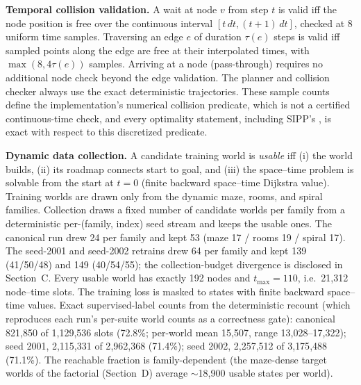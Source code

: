 \documentclass[letterpaper]{article} %
\begin{document}
\begin{table}[t]
\label{tab:archspec}
\end{table}

\textbf{Temporal collision validation.} A wait at node $v$ from step $t$ is valid iff the node position is free over the continuous interval $[t\,dt, (t{+}1)\,dt]$, checked at 8 uniform time samples. Traversing an edge $e$ of duration $\tau(e)$ steps is valid iff sampled points along the edge are free at their interpolated times, with $\max(8, 4\tau(e))$ samples. Arriving at a node (pass-through) requires no additional node check beyond the edge validation. The planner and collision checker always use the exact deterministic trajectories. These sample counts define the implementation's numerical collision predicate, which is not a certified continuous-time check, and every optimality statement, including SIPP's \citep{phillips2011sipp}, is exact with respect to this discretized predicate.

\textbf{Dynamic data collection.} A candidate training world is \emph{usable} iff (i) the world builds, (ii) its roadmap connects start to goal, and (iii) the space--time problem is solvable from the start at $t{=}0$ (finite backward space--time Dijkstra value). Training worlds are drawn only from the dynamic maze, rooms, and spiral families. Collection draws a fixed number of candidate worlds per family from a deterministic per-(family, index) seed stream and keeps the usable ones. The canonical run drew 24 per family and kept 53 (maze 17 / rooms 19 / spiral 17). The seed-2001 and seed-2002 retrains drew 64 per family and kept 139 (41/50/48) and 149 (40/54/55); the collection-budget divergence is disclosed in Section~C. Every usable world has exactly 192 nodes and $t_{\max}{=}110$, i.e.\ 21{,}312 node--time slots. The training loss is masked to states with finite backward space--time values. Exact supervised-label counts from the deterministic recount (which reproduces each run's per-suite world counts as a correctness gate): canonical 821{,}850 of 1{,}129{,}536 slots (72.8\%; per-world mean 15{,}507, range 13{,}028--17{,}322); seed 2001, 2{,}115{,}331 of 2{,}962{,}368 (71.4\%); seed 2002, 2{,}257{,}512 of 3{,}175{,}488 (71.1\%). The reachable fraction is family-dependent (the maze-dense target worlds of the factorial (Section~D) average $\sim$18{,}900 usable states per world).
\end{document}

